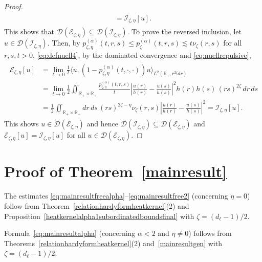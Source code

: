 \documentclass[12pt,reqno]{amsart}
\theoremstyle{definition}
\theoremstyle{remark}
\numberwithin{equation}{section}
\newcommand{\1}{\mathbbm{1}}
\newcommand{\D}{\mathcal{D}}
\newcommand{\R}{\mathbb{R}}
\def\ce{\mathcal{E}}
\def\ci{\mathcal{I}}
\begin{document}
\begin{proof}
\begin{align}
\begin{split}
        = \ci_{\zeta,\eta}[u].
    \end{split}
  \end{align}
  This shows that $\D(\ce_{\zeta,\eta})\subseteq\D(\ci_{\zeta,\eta})$. To prove the reversed inclusion, let $u\in\D(\ci_{\zeta,\eta})$. Then, by $p_{\zeta,\eta}^{(\alpha)}(t,r,s)\leq p_\zeta^{(\alpha)}(t,r,s)\lesssim t\nu_\zeta(r,s)$ for all $r,s,t>0$, \eqref{eq:defnuell4}, by the dominated convergence and \eqref{eq:nuellrepulsive},
  \begin{align}
    \begin{split}
      \ce_{\zeta,\eta}[u]
      & = \lim_{t\to0}\frac1t\langle u,(1-p_{\zeta,\eta}^{(\alpha)}(t,\cdot,\cdot))u\rangle_{L^2(\R_+,r^{2\zeta}dr)} \\
      & = \lim_{t\to0}\frac12 \iint_{\R_+\times\R_+}\frac{p_{\zeta,\eta}^{(\alpha)}(t,r,s)}{t} \left|\frac{u(r)}{h(r)} - \frac{u(s)}{h(s)}\right|^2 h(r)h(s)\, (rs)^{2\zeta}\,dr\,ds \\
      & = \frac12 \iint_{\R_+\times\R_+}dr\,ds\, (rs)^{2\zeta-\eta}\nu_\zeta(r,s) \left|\frac{u(r)}{h(r)} - \frac{u(s)}{h(s)}\right|^2
      = \ci_{\zeta,\eta}[u].
    \end{split}
  \end{align}
  This shows $u\in\D(\ce_{\zeta,\eta})$ and hence $\D(\ci_{\zeta,\eta})\subseteq\D(\ce_{\zeta,\eta})$
  and $\ce_{\zeta,\eta}[u]=\ci_{\zeta,\eta}[u]$ for all $u\in\D(\ce_{\zeta,\eta})$.
\end{proof}



\section{Proof of Theorem~\ref{mainresult}}
\label{s:proof}

The estimates \eqref{eq:mainresultfreealpha}--\eqref{eq:mainresultfree2} (concerning $\eta=0$) follow from Theorem~\ref{relationhardyformheatkernel}(2) and Proposition~\ref{heatkernelalpha1subordinatedboundsfinal} with $\zeta=(d_\ell-1)/2$.

Formula~\eqref{eq:mainresultalpha} (concerning $\alpha<2$ and $\eta\neq0$) follows from Theorems~\ref{relationhardyformheatkernel}(2) and~\ref{mainresultgen} with $\zeta=(d_\ell-1)/2$.
\end{document}
